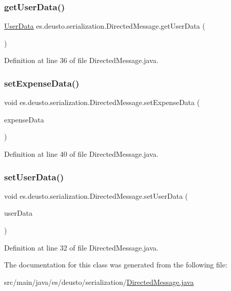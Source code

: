\subsubsection{\texorpdfstring{get\+User\+Data()}{getUserData()}}
{\footnotesize\ttfamily \hyperlink{classes_1_1deusto_1_1serialization_1_1_user_data}{User\+Data} es.\+deusto.\+serialization.\+Directed\+Message.\+get\+User\+Data (\begin{DoxyParamCaption}{ }\end{DoxyParamCaption})}



Definition at line 36 of file Directed\+Message.\+java.

\mbox{\label{classes_1_1deusto_1_1serialization_1_1_directed_message_a2f339d3849855fd1fc88cdf6a6c3e2cf}} 
\subsubsection{\texorpdfstring{set\+Expense\+Data()}{setExpenseData()}}
{\footnotesize\ttfamily void es.\+deusto.\+serialization.\+Directed\+Message.\+set\+Expense\+Data (\begin{DoxyParamCaption}\item[{\hyperlink{classes_1_1deusto_1_1serialization_1_1_expense_data}{Expense\+Data}}]{expense\+Data }\end{DoxyParamCaption})}



Definition at line 40 of file Directed\+Message.\+java.

\mbox{\label{classes_1_1deusto_1_1serialization_1_1_directed_message_a4a3f7852410bc29d73179294836e84c4}} 
\subsubsection{\texorpdfstring{set\+User\+Data()}{setUserData()}}
{\footnotesize\ttfamily void es.\+deusto.\+serialization.\+Directed\+Message.\+set\+User\+Data (\begin{DoxyParamCaption}\item[{\hyperlink{classes_1_1deusto_1_1serialization_1_1_user_data}{User\+Data}}]{user\+Data }\end{DoxyParamCaption})}



Definition at line 32 of file Directed\+Message.\+java.



The documentation for this class was generated from the following file\+:\begin{DoxyCompactItemize}
\item 
src/main/java/es/deusto/serialization/\hyperlink{_directed_message_8java}{Directed\+Message.\+java}\end{DoxyCompactItemize}
